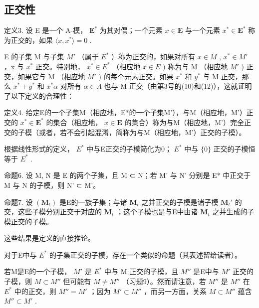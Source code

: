 \subsection{正交性}

定义3. 设 E 是一个 A-模， \(\mathbf{E}^*\) 为其对偶；一个元素 \(x \in \mathbf{E}\) 与一个元素 \(x^* \in \mathbf{E}^*\) 称为正交的，如果 \(\langle x, x^* \rangle = 0\) .

E 的子集 M 与子集 \(M'\) （属于 \(E^{*}\) ）称为正交的，如果对所有 \(x \in M\) , \(x^{*} \in M'\) ，x 与 \(x^{*}\) 正交。特别地， \(x^{*} \in E^{*}\) （相应地 \(x \in E\) ) 称为与 M （相应地 \(M'\) ) 正交，如果它与 M （相应地 \(M'\) ) 的每个元素正交。如果 \(x^{*}\) 和 \(y^{*}\) 与 M 正交，那么 \(x^{*} + y^{*}\) 和 \(x^{*}\alpha\) 对所有 \(\alpha \in A\) 也与 M 正交（由第3号的(10)和(12)），这就证明了以下定义的合理性：

定义4. 给定E的一个子集M（相应地，E*的一个子集M'），与M（相应地，M'）正交的 \(x^* \in \mathbf{E}^*\) 的集合（相应地， \(x \in \mathbf{E}\) 的集合）称为与M（相应地，M'）完全正交的子模（或者，若不会引起混淆，简称为与M（相应地，M'）正交的子模）。

根据线性形式的定义， \(E^{*}\) 中与E正交的子模简化为0； \(E^{*}\) 中与 \(\{0\}\) 正交的子模恒等于 \(E^{*}\) .

命题6. 设 M, N 是 E 的两个子集，且 M ⊂ N；若 M' 与 N' 分别是 E* 中正交于 M 与 N 的子模，则 N' ⊂ M'。

命题7. 设 \((\mathbf{M}_t)\) 是E的一族子集；与诸 \(\mathbf{M}_t\) 之并正交的子模是诸子模 \(\mathbf{M}_t'\) 的交，这些子模分别正交于对应的 \(\mathbf{M}_t\) ；这个子模也是与E中由诸 \(\mathbf{M}_t\) 之并生成的子模正交的子模。

这些结果是定义的直接推论。

对于E中与 \(E^{*}\) 的子集正交的子模，存在一个类似的命题（其表述留给读者）。

若M是E的一个子模， \(M'\) 是 \(E^{*}\) 中与 M 正交的子模，且 \(M''\) 是E中与 \(M'\) 正交的子模，则 \(M \subset M''\) 但可能有 \(M \neq M''\) （习题9）。然而请注意，若 \(M''\) 是 \(M''\) 在 \(E^{*}\) 中的正交，则 \(M'' = M'\) ；因为 \(M' \subset M''\) ，而另一方面，关系 \(M \subset M''\) 蕴含 \(M'' \subset M'\) .

